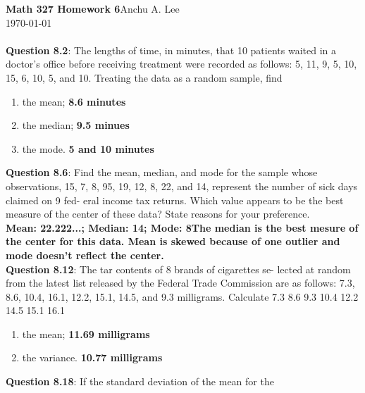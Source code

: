 \documentclass{article}
\begin{document}
    \noindent\textbf{Math 327 Homework 6}\hfill Anchu A. Lee\\
    \noindent\today\\\\
    \noindent\textbf{Question 8.2}: The lengths of time, in minutes, that 10 patients
    waited in a doctor’s office before receiving treatment
    were recorded as follows: 5, 11, 9, 5, 10, 15, 6, 10, 5,
    and 10. Treating the data as a random sample, find
        \begin{enumerate}[label = (\alph*) ]
            \item the mean;\newline
            \textbf{8.6 minutes}
            \item the median;\newline
            \textbf{9.5 minues}
            \item the mode.\newline
            \textbf{5 and 10 minutes}
        \end{enumerate}
    \textbf{Question 8.6}: Find the mean, median, and mode for the sample
    whose observations, 15, 7, 8, 95, 19, 12, 8, 22, and 14,
    represent the number of sick days claimed on 9 fed-
    eral income tax returns. Which value appears to be
    the best measure of the center of these data? State
    reasons for your preference.\\\newline
    \textbf{Mean: 22.222...; Median: 14; Mode: 8\newline The median is the best
    mesure of the center for this data. Mean is skewed because of one outlier
    and mode doesn't reflect the center.}\\\newline
    \textbf{Question 8.12}: The tar contents of 8 brands of cigarettes se-
    lected at random from the latest list released by the
    Federal Trade Commission are as follows: 7.3, 8.6, 10.4,
    16.1, 12.2, 15.1, 14.5, and 9.3 milligrams. Calculate
    7.3 8.6 9.3 10.4 12.2 14.5 15.1 16.1
        \begin{enumerate}[label = (\alph*) ]
            \item the mean;\newline
            \textbf{11.69 milligrams}
            \item the variance.\newline
            \textbf{10.77 milligrams}
        \end{enumerate}
    \textbf{Question 8.18}: If the standard deviation of the mean for the
\end{document}
